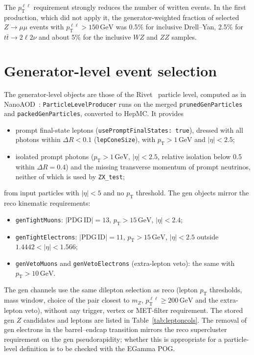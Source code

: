 \documentclass[11pt]{article}
\newcommand{\pt}{p_{\mathrm{T}}}
\newcommand{\GeV}{\ensuremath{\,\mathrm{GeV}}}
\newcommand{\ptll}{\pt^{\ell\ell}}
\newcommand{\code}[1]{\texttt{#1}}
\begin{document}
The $\ptll$ requirement strongly reduces the number of written events. In the first production, which did not apply it,
the generator-weighted fraction of selected $Z\to\mu\mu$ events with $\ptll > 150\GeV$ was 0.5\% for inclusive
Drell--Yan, 2.5\% for $t\bar t\to 2\ell2\nu$ and about 5\% for the inclusive $WZ$ and $ZZ$ samples.

\section{Generator-level event selection}
\label{sec:gen}

The generator-level objects are those of the Rivet~\cite{Bierlich:2019rhm} particle level, computed as in
NanoAOD~\cite{xpogdocs}: \code{ParticleLevelProducer}
runs on the merged \code{prunedGenParticles} and \code{packedGenParticles}, converted to HepMC. It provides
\begin{itemize}
\item prompt final-state leptons (\code{usePromptFinalStates: true}), dressed with all photons within $\Delta R < 0.1$
  (\code{lepConeSize}), with $\pt > 1\GeV$ and $|\eta| < 2.5$;
\item isolated prompt photons ($\pt > 1\GeV$, $|\eta| < 2.5$, relative isolation below 0.5 within $\Delta R = 0.4$) and
  the missing transverse momentum of prompt neutrinos, neither of which is used by \code{ZX\_test};
\end{itemize}
from input particles with $|\eta| < 5$ and no $\pt$ threshold. The gen objects mirror the reco kinematic requirements:
\begin{itemize}
\item \code{genTightMuons}: $|\mathrm{PDG\,ID}| = 13$, $\pt > 15\GeV$, $|\eta| < 2.4$;
\item \code{genTightElectrons}: $|\mathrm{PDG\,ID}| = 11$, $\pt > 15\GeV$, $|\eta| < 2.5$ outside
  $1.4442 < |\eta| < 1.566$;
\item \code{genVetoMuons} and \code{genVetoElectrons} (extra-lepton veto): the same with $\pt > 10\GeV$.
\end{itemize}
The gen channels use the same dilepton selection as reco (lepton $\pt$ thresholds, mass window, choice of the pair
closest to $m_Z$, $\ptll \geq 200\GeV$ and the extra-lepton veto), without any trigger, vertex or MET-filter
requirement. The stored gen $Z$ candidates and leptons are listed in Table~\ref{tab:leptoncols}. The removal of gen
electrons in the barrel--endcap transition mirrors the reco supercluster requirement on the gen pseudorapidity; whether
this is appropriate for a particle-level definition is to be checked with the EGamma POG.
\end{document}
